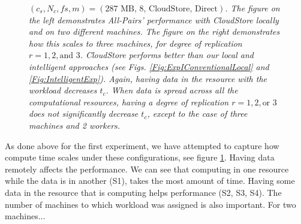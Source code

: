 \documentclass{rspublic}
\newcommand{\micnote}[1]{ {\textcolor{blue} { ***Michael: #1 }}}
\newcommand{\betynote}[1]{ {\textcolor{orange} { ***Bety: #1 }}}
\newcommand{\jhanote}[1]{} \newcommand{\micnote}[1]{}\newcommand{\betynote}[1]{} \newcommand{\fixme}[1]{}
\begin{document}
\begin{figure}
\begin{center}
{\label{Fig:experiment3:b}
}
\caption{\textit{$(c_s, N_c, fs, m) = (\mbox{287 MB, 8, CloudStore, Direct})$. The figure on the left demonstrates All-Pairs'
performance with CloudStore locally and on two different machines. The
 figure on the right demonstrates how this scales to three machines, for degree of replication $r=1,2,\mbox{and } 3$. CloudStore performs better than our local and intelligent approaches (see Figs. \ref{Fig:ExpIConventionalLocal} and \ref{Fig:IntelligentExp}). Again, having data in the resource with the workload decreases $t_c$. When data is spread across all the computational resources, having a degree of replication $r = 1, 2, \mbox{or } 3$ does not significantly decrease $t_c$, except to the case of three machines and 2 workers.}
\jhanote{This caption needs attention}}
\label{Fig:experiment3}
\end{center}
\end{figure}


As done above for the first experiment, we have attempted to capture how
compute time scales under these configurations, see figure \ref{Fig:experiment3}. Having data remotely affects the performance. We can see that computing in one resource while the data is in another (S1), takes the most amount of time. Having some data in the resource that is computing helps performance (S2, S3, S4). The number of machines to which workload was assigned is also important. For two machines...
\end{document}
